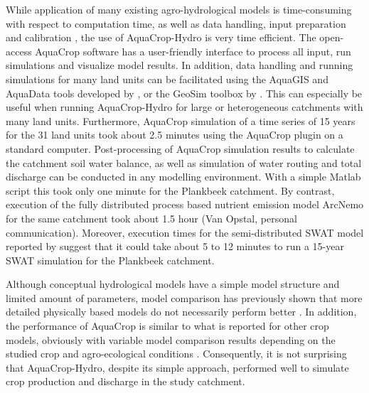 While application of many existing agro-hydrological models is time-consuming with respect to computation time, as well as data handling, input preparation and calibration \parencite{singh2006}, the use of AquaCrop-Hydro is very time efficient. The open-access AquaCrop software has a user-friendly interface to process all input, run simulations and visualize model results. In addition, data handling and running simulations for many land units can be facilitated using the AquaGIS and AquaData tools developed by \textcite{lorite2013}, or the GeoSim toolbox by \textcite{thorp2013}. This can especially be useful when running AquaCrop-Hydro for large or heterogeneous catchments with many land units. Furthermore, AquaCrop simulation of a time series of 15 years for the 31 land units took about 2.5 minutes using the AquaCrop plugin on a standard computer. Post-processing of AquaCrop simulation results to calculate the catchment soil water balance, as well as simulation of water routing and total discharge can be conducted in any modelling environment. With a simple Matlab script \parencite{vangaelen2016d} this took only one minute for the Plankbeek catchment. By contrast, execution of the fully distributed process based nutrient emission model ArcNemo for the same catchment took about 1.5 hour (Van Opstal, personal communication). Moreover, execution times for the semi-distributed SWAT model reported by \textcite{yalew2013} suggest that it could take about 5 to 12 minutes to run a 15-year SWAT simulation for the Plankbeek catchment. 
 
Although conceptual hydrological models have a simple model structure and limited amount of parameters, model comparison has previously shown that more detailed physically based models do not necessarily perform better \parencite{breuer2009, refsgaard1996, vansteenkiste2014}. In addition, the performance of AquaCrop is similar to what is reported for other crop models, obviously with variable model comparison results depending on the studied crop and agro-ecological conditions \parencite{abisaab2015, castanedavera2015, paredes2014, todorovic2009}. Consequently, it is not surprising that AquaCrop-Hydro, despite its simple approach, performed well to simulate crop production and discharge in the study catchment. 


